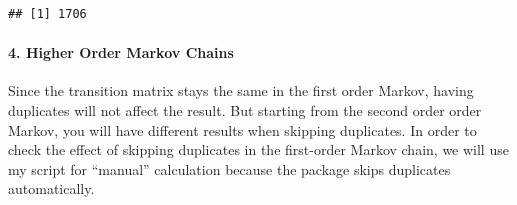 \documentclass[
]{book}
\begin{document}
\begin{verbatim}
## [1] 1706
\end{verbatim}

\hypertarget{higher-order-markov-chains}{%
\paragraph{4. Higher Order Markov Chains}\label{higher-order-markov-chains}}

Since the transition matrix stays the same in the first order Markov, having duplicates will not affect the result. But
starting from the second order order Markov, you will have different results when skipping duplicates. In order to check
the effect of skipping duplicates in the first-order Markov chain, we will use my script for ``manual'' calculation
because the package skips duplicates automatically.
\end{document}
